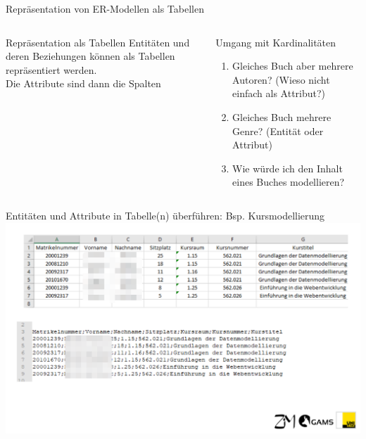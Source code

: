 \begin{frame}{Repräsentation von ER-Modellen als Tabellen}
  \begin{columns}[T,onlytextwidth]
    \footnotesize
    \begin{block}{Repräsentation als Tabellen}
    Entitäten und deren Beziehungen können als Tabellen repräsentiert werden. \\
    Die Attribute sind dann die Spalten
    \end{block}


      \begin{exampleblock}{Umgang mit Kardinalitäten}
      \begin{enumerate}\small
          \item Gleiches Buch aber mehrere Autoren? (Wieso nicht einfach als Attribut?)
          \item Gleiches Buch mehrere Genre? (Entität oder Attribut)
          \item Wie würde ich den Inhalt eines Buches modellieren?
      \end{enumerate} \small
      \end{exampleblock}

  \end{columns}
\end{frame}

\begin{frame}{Entitäten und Attribute in Tabelle(n) überführen: Bsp. Kursmodellierung}
    \includegraphics[width=\textwidth]{img/wdh-studierende-csv.png}
\end{frame}

